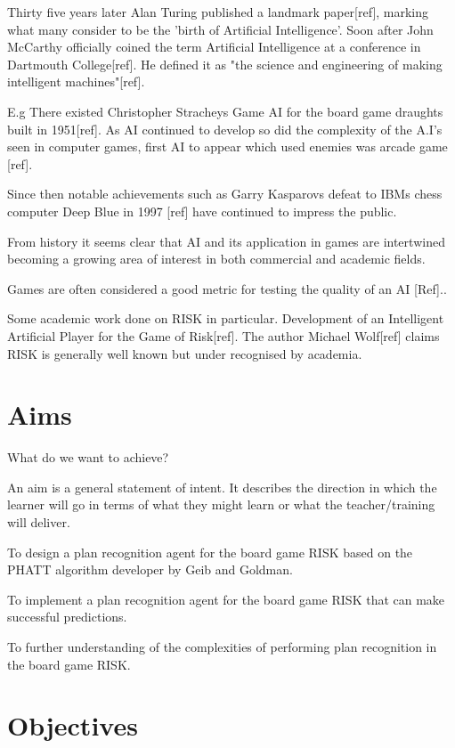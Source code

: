\documentclass[parskip]{cs4rep}
\begin{document}
Thirty five years later Alan Turing published a landmark paper[ref], marking what many consider to be the 'birth of Artificial Intelligence'. Soon after John McCarthy officially coined the term Artificial Intelligence at a conference in Dartmouth College[ref]. He defined it as "the science and engineering of making intelligent machines"[ref].

E.g
There existed Christopher Stracheys Game AI for the board game draughts built in 1951[ref]. As AI continued to develop so did the complexity of the A.I's seen in computer games, first AI to appear which used enemies was arcade game [ref].

Since then notable achievements such as Garry Kasparovs defeat to IBMs chess computer Deep Blue in 1997 [ref] have continued to impress the public. 

From history it seems clear that AI and its application in games are intertwined becoming a growing area of interest in both commercial and academic fields.

Games are often considered a good metric for testing the quality of an AI [Ref].. 

Some academic work done on RISK in particular. Development of an Intelligent Artificial Player for the Game of Risk[ref]. The author Michael Wolf[ref] claims RISK is generally well known but under recognised by academia.

\section{Aims}

What do we want to achieve?

An aim is a general statement of intent. It describes the direction in which the learner will go in terms of what they might learn or what the teacher/training will deliver.

To design a plan recognition agent for the board game RISK based on the PHATT algorithm developer by Geib and Goldman.

To implement a plan recognition agent for the board game RISK that can make successful predictions.

To further understanding of the complexities of performing plan recognition in the board game RISK.

\section{Objectives}
\end{document}
